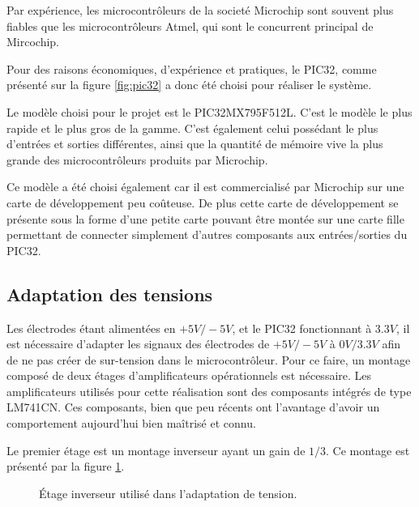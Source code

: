 \documentclass[letterpaper, twoside, 12pt, memoire, creativecommons, hyperref]{thETS}
\begin{document}
Par expérience, les microcontrôleurs de la societé Microchip sont souvent plus fiables que les microcontrôleurs Atmel, qui sont le concurrent principal de Mircochip.

Pour des raisons économiques, d'expérience et pratiques, le PIC32, comme présenté sur la figure \ref{fig:pic32} a donc été choisi pour réaliser le système.
 
Le modèle choisi pour le projet est le PIC32MX795F512L. C'est le modèle le plus rapide et le plus gros de la gamme. C'est également celui possédant le plus d'entrées et sorties différentes, ainsi que la quantité de mémoire vive la plus grande des microcontrôleurs produits par Microchip.

Ce modèle a été choisi également car il est commercialisé par Microchip sur une carte de développement peu coûteuse. De plus cette carte de développement se présente sous la forme d'une petite carte pouvant être montée sur une carte fille permettant de connecter simplement d'autres composants aux entrées/sorties du PIC32. 


\subsection{Adaptation des tensions}

Les électrodes étant alimentées en $+5V/-5V$, et le PIC32 fonctionnant à $3.3V$, il est nécessaire d’adapter les signaux des électrodes de $+5V/-5V$ à $0V/3.3V$ afin de ne pas créer de sur-tension dans le microcontrôleur. Pour ce faire, un montage composé de deux étages d'amplificateurs opérationnels est nécessaire.  Les amplificateurs utilisés pour cette réalisation sont des composants intégrés de type LM741CN. Ces composants, bien que peu récents ont l'avantage d'avoir un comportement aujourd'hui bien maîtrisé et connu. 

Le premier étage est un montage inverseur ayant un gain de $1/3$. Ce montage est présenté par la figure \ref{fig:inverseur}.

\begin{figure}
	\centering
	\caption{Étage inverseur utilisé dans l'adaptation de tension.}
	\label{fig:inverseur}
\end{figure}
\end{document}

